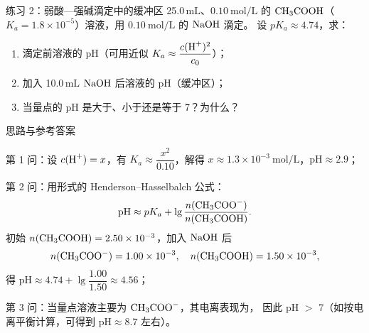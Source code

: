 \documentclass[a4paper,11pt]{ctexart}
\begin{document}
\begin{examplebox}{练习 2：弱酸—强碱滴定中的缓冲区}
  25.0\,$\mathrm{mL}$、$0.10\ \mathrm{mol/L}$ 的 $\ce{CH3COOH}$（$K_a = 1.8\times 10^{-5}$）溶液，用 $0.10\ \mathrm{mol/L}$ 的 $\ce{NaOH}$ 滴定。
  设 $pK_a \approx 4.74$，求：
  \begin{enumerate}
    \item 滴定前溶液的 pH（可用近似 $K_a \approx \dfrac{c(\ce{H^+})^2}{c_0}$）；
    \item 加入 10.0\,$\mathrm{mL}$ $\ce{NaOH}$ 后溶液的 pH（缓冲区）；
    \item 当量点的 pH 是大于、小于还是等于 7？为什么？
  \end{enumerate}

  \begin{proofbox}{思路与参考答案}
    \begin{focuspoints}
      \item 第 1 问：设 $c(\ce{H^+}) = x$，有 $K_a \approx \dfrac{x^2}{0.10}$，解得
      $x \approx 1.3\times 10^{-3}\ \mathrm{mol/L}$，$\mathrm{pH} \approx 2.9$；
      \item 第 2 问：用形式的 Henderson–Hasselbalch 公式：
        \[
          \mathrm{pH} \approx pK_a + \lg\dfrac{n(\ce{CH3COO^-})}{n(\ce{CH3COOH})}.
        \]
        初始 $n(\ce{CH3COOH}) = 2.50\times 10^{-3}$，加入 $\ce{NaOH}$ 后
        \[
          n(\ce{CH3COO^-}) = 1.00\times 10^{-3},\quad
          n(\ce{CH3COOH}) = 1.50\times 10^{-3},
        \]
        得 $\mathrm{pH} \approx 4.74 + \lg\dfrac{1.00}{1.50} \approx 4.56$；
      \item 第 3 问：当量点溶液主要为 $\ce{CH3COO^-}$，其电离表现为，
      因此 pH $>$ 7（如按电离平衡计算，可得到 $\mathrm{pH} \approx 8.7$ 左右）。
    \end{focuspoints}
  \end{proofbox}
\end{examplebox}
\end{document}
